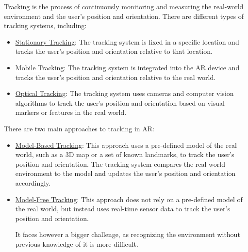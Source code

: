 Tracking is the process of continuously monitoring and measuring the real-world environment and the user's position and orientation. There are different types of tracking systems, including:
\begin{itemize}
    \item \ul{Stationary Tracking}: The tracking system is fixed in a specific location and tracks the user's position and orientation relative to that location.
    \item \ul{Mobile Tracking}: The tracking system is integrated into the AR device and tracks the user's position and orientation relative to the real world.
    \item \ul{Optical Tracking}: The tracking system uses cameras and computer vision algorithms to track the user's position and orientation based on visual markers or features in the real world.
\end{itemize}

There are two main approaches to tracking in AR:
\begin{itemize}
    \item \ul{Model-Based Tracking}: This approach uses a pre-defined model of the real world, such as a 3D map or a set of known landmarks, to track the user's position and orientation. The tracking system compares the real-world environment to the model and updates the user's position and orientation accordingly.
    
    \item \ul{Model-Free Tracking}: This approach does not rely on a pre-defined model of the real world, but instead uses real-time sensor data to track the user's position and orientation.
    
    It faces however a bigger challenge, as recognizing the environment without previous knowledge of it is more difficult.
\end{itemize}

